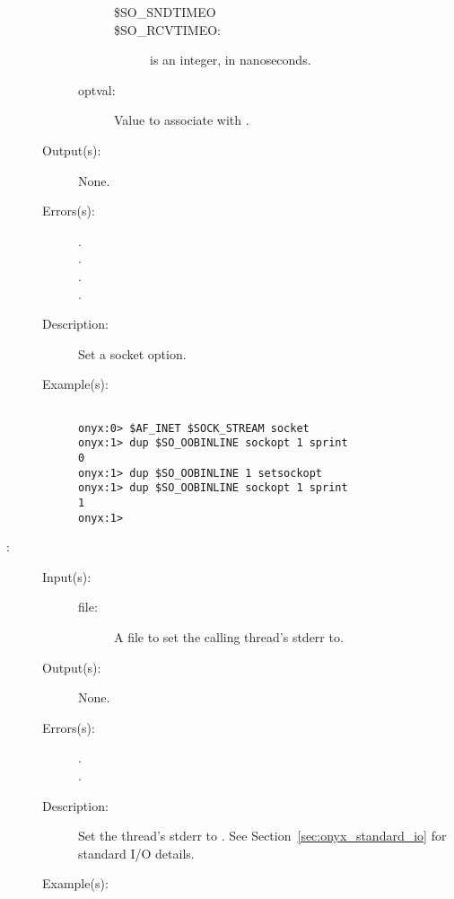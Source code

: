 \begin{description}
\begin{description}
\begin{description}
\begin{description}
			\item[\$SO\_SNDTIMEO]
			\item[\$SO\_RCVTIMEO: ]
				 is an integer, in nanoseconds.
			\end{description}
		\item[optval: ]
			Value to associate with .
		\end{description}
	\item[Output(s): ] None.
	\item[Errors(s): ]
		\begin{description}\item[]
		\item[.]
		\item[.]
		\item[.]
		\item[.]
		\end{description}
	\item[Description: ]
		Set a socket option.
	\item[Example(s): ]\begin{verbatim}

onyx:0> $AF_INET $SOCK_STREAM socket
onyx:1> dup $SO_OOBINLINE sockopt 1 sprint
0
onyx:1> dup $SO_OOBINLINE 1 setsockopt
onyx:1> dup $SO_OOBINLINE sockopt 1 sprint
1
onyx:1>
		\end{verbatim}
	\end{description}
\label{systemdict:setstderr}
\item[{\onyxop{file}{setstderr}{--}}: ]
	\begin{description}\item[]
	\item[Input(s): ]
		\begin{description}\item[]
		\item[file: ]
			A file to set the calling thread's stderr to.
		\end{description}
	\item[Output(s): ] None.
	\item[Errors(s): ]
		\begin{description}\item[]
		\item[.]
		\item[.]
		\end{description}
	\item[Description: ]
		Set the thread's stderr to .  See
		Section~\ref{sec:onyx_standard_io} for standard I/O details.
	\item[Example(s): ]\begin{verbatim}


\end{verbatim}
\end{description}
\end{description}
